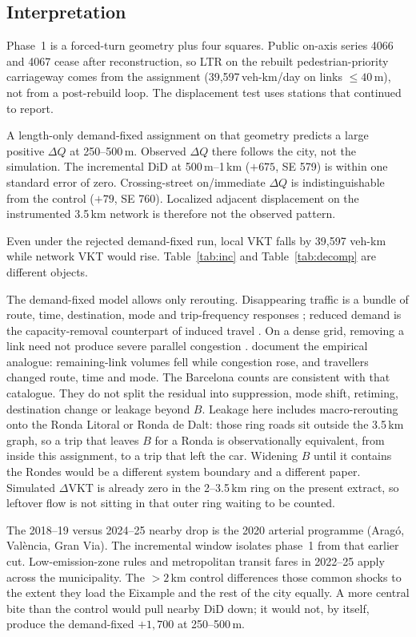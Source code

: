 \documentclass[a4paper,fleqn]{cas-dc}
\newcommand{\DQ}{\Delta Q}
\newcommand{\DVKT}{\Delta\mathrm{VKT}}
\begin{document}
\subsection{Interpretation}

Phase~1 is a forced-turn geometry plus four squares. Public on-axis series
4066 and 4067 cease after reconstruction, so LTR on the rebuilt
pedestrian-priority carriageway comes from the assignment (39{,}597\,veh-km/day
on links $\le 40$\,m), not from a post-rebuild loop. The displacement test
uses stations that continued to report.

A length-only demand-fixed assignment on that geometry predicts a large positive $\DQ$ at
250--500\,m. Observed $\DQ$ there follows the city, not the simulation. The
incremental DiD at 500\,m--1\,km ($+675$, SE 579) is within one standard
error of zero. Crossing-street on/immediate $\DQ$ is indistinguishable from
the control ($+79$, SE 760). Localized adjacent displacement on the
instrumented 3.5\,km network is therefore not the observed pattern.

Even under the rejected demand-fixed run, local VKT falls by 39{,}597 veh-km
while network VKT would rise. Table~\ref{tab:inc} and Table~\ref{tab:decomp}
are different objects.

The demand-fixed model allows only rerouting. Disappearing traffic is a
bundle of route, time, destination, mode and trip-frequency responses
\citep{Cairns2002}; reduced demand is the capacity-removal counterpart of
induced travel \citep{SACTRA1994,Goodwin1996}. On a dense grid, removing a
link need not produce severe parallel congestion
\citep{Braess1968,Downs1962,Thomson1977}. \citet{Tennoy2021} document the
empirical analogue: remaining-link volumes fell while congestion rose, and
travellers changed route, time and mode. The Barcelona counts are consistent
with that catalogue. They do not split the residual into suppression, mode
shift, retiming, destination change or leakage beyond $B$. Leakage here
includes macro-rerouting onto the Ronda Litoral or Ronda de Dalt: those
ring roads sit outside the 3.5\,km graph, so a trip that leaves $B$ for a
Ronda is observationally equivalent, from inside this assignment, to a trip
that left the car. Widening $B$ until it contains the Rondes would be a
different system boundary and a different paper. Simulated $\DVKT$ is already
zero in the 2--3.5\,km ring on the present extract, so leftover flow is not
sitting in that outer ring waiting to be counted.

The 2018--19 versus 2024--25 nearby drop is the 2020 arterial programme
(Arag\'o, Val\`encia, Gran Via). The incremental window isolates phase~1 from
that earlier cut. Low-emission-zone rules and metropolitan transit fares in
2022--25 apply across the municipality. The $>2$\,km control differences those
common shocks to the extent they load the Eixample and the rest of the city
equally. A more central bite than the control would pull nearby DiD down; it
would not, by itself, produce the demand-fixed $+1{,}700$ at 250--500\,m.
\end{document}

